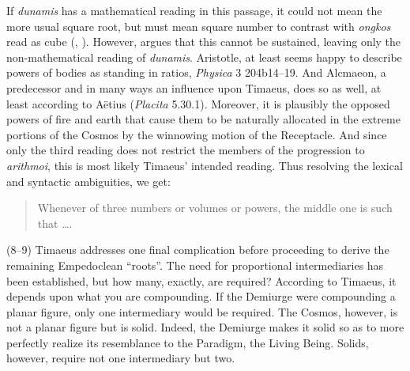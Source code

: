 If \emph{dunamis} has a mathematical reading in this passage, it could not mean the more usual square root, but must mean square number to contrast with \emph{ongkos} read as cube (\citealt[97 n12]{Archer-Hind:1888qd}, \citealt[45--52]{Cornford:1935fk}). However, \citet{Prtichard:1990aa} argues that this cannot be sustained, leaving only the non-mathematical reading of \emph{dunamis}. Aristotle, at least seems happy to describe powers of bodies as standing in ratios, \emph{Physica} 3 204b14--19. And Alcmaeon, a predecessor and in many ways an influence upon Timaeus, does so as well, at least according to Aëtius (\emph{Placita} 5.30.1). Moreover, it is plausibly the opposed powers of fire and earth that cause them to be naturally allocated in the extreme portions of the Cosmos by the winnowing motion of the Receptacle. And since only the third reading does not restrict the members of the progression to \emph{arithmoi}, this is most likely Timaeus' intended reading. Thus resolving the lexical and syntactic ambiguities, we get:
\begin{quote}
	Whenever of three numbers or volumes or powers, the middle one is such that \dots.
\end{quote}

(8--9) Timaeus addresses one final complication before proceeding to derive the remaining Empedoclean ``roots''. The need for proportional intermediaries has been established, but how many, exactly, are required? According to Timaeus, it depends upon what you are compounding. If the Demiurge were compounding a planar figure, only one intermediary would be required. The Cosmos, however, is not a planar figure but is solid. Indeed, the Demiurge makes it solid so as to more perfectly realize its resemblance to the Paradigm, the Living Being. Solids, however, require not one intermediary but two. 

